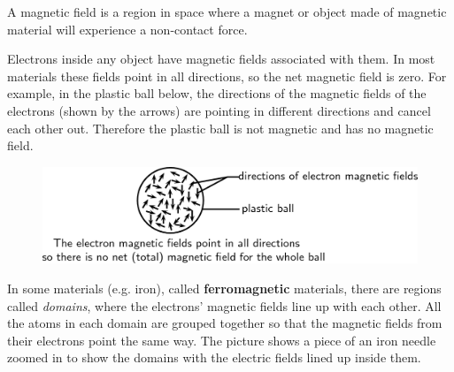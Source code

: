       \label{m37830*id128332}A magnetic field is a region in space where a magnet or object made of magnetic material will experience a non-contact force.\par 
      \label{m37830*id128337}Electrons inside any object have magnetic fields associated
with them. In most materials these fields point in all
directions, so the net magnetic field is zero. For example, in the plastic ball below,
the directions of the magnetic fields of the electrons (shown by the arrows) are pointing
in different directions and cancel each other out. Therefore the plastic ball is not magnetic and
has no magnetic field.\par 
      \label{m37830*id128346}
        
    \setcounter{subfigure}{0}


	\begin{figure}[H] %
    \begin{center}
    \label{m37830*id128349!!!underscore!!!media}\label{m37830*id128349!!!underscore!!!printimage}\includegraphics[width=0.8\columnwidth]{col11305.imgs/m37830_PG10C7_001.png} %
        
      \vspace{2pt}
    \vspace{.1in}
    
    \end{center}

 \end{figure}   

    \addtocounter{footnote}{-0}
    
      \par 
      \label{m37830*id128355}In some materials (e.g. iron), called \textbf{ferromagnetic} materials, there are regions called \textsl{domains}, where the electrons' magnetic fields line up with each other. All the atoms in each domain are grouped together so that the magnetic fields from their electrons point the same way. The picture shows a piece of an iron needle zoomed in to show the domains with the electric fields lined up inside them.\par 
      \label{m37830*id128371}
        
